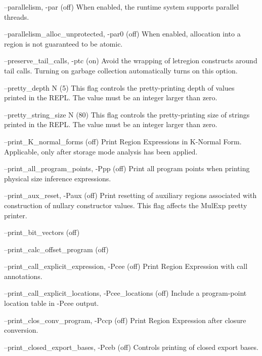 \documentclass[12pt]{book}
\begin{document}
\begin{scriptcode}
--parallelism, -par                                      (off)
     When enabled, the runtime system supports
     parallel threads.

--parallelism_alloc_unprotected, -par0                   (off)
     When enabled, allocation into a region is not
     guaranteed to be atomic.

--preserve_tail_calls, -ptc                               (on)
     Avoid the wrapping of letregion constructs around
     tail calls. Turning on garbage collection
     automatically turns on this option.

--pretty_depth N                                           (5)
     This flag controls the pretty-printing depth of
     values printed in the REPL. The value must be an
     integer larger than zero.

--pretty_string_size N                                    (80)
     This flag controls the pretty-printing size of
     strings printed in the REPL. The value must be an
     integer larger than zero.

--print_K_normal_forms                                   (off)
     Print Region Expressions in K-Normal Form. Applicable,
     only after storage mode analysis has been applied.

--print_all_program_points, -Ppp                         (off)
     Print all program points when printing physical size
     inference expressions.

--print_aux_reset, -Paux                                 (off)
     Print resetting of auxiliary regions associated with
     construction of nullary constructor values. This flag
     affects the MulExp pretty printer.

--print_bit_vectors                                      (off)

--print_calc_offset_program                              (off)

--print_call_explicit_expression, -Pcee                  (off)
     Print Region Expression with call annotations.

--print_call_explicit_locations, -Pcee_locations         (off)
     Include a program-point location table in -Pcee output.

--print_clos_conv_program, -Pccp                         (off)
     Print Region Expression after closure conversion.

--print_closed_export_bases, -Pceb                       (off)
     Controls printing of closed export bases.


\end{scriptcode}
\end{document}
